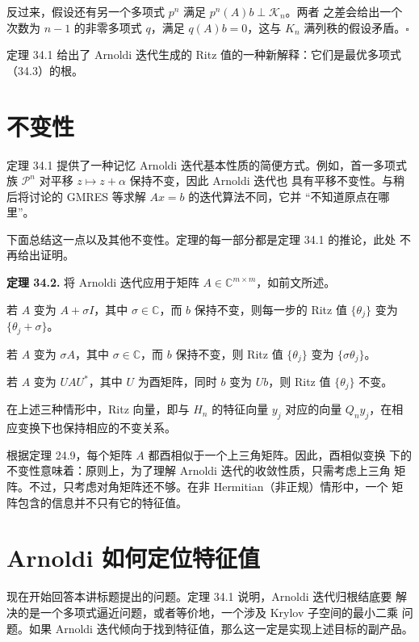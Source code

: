 \documentclass[UTF8,fontset=none,12pt]{ctexart}
\begin{document}
反过来，假设还有另一个多项式 $p^n$ 满足 $p^n(A)b\perp\mathcal K_n$。两者
之差会给出一个次数为 $n-1$ 的非零多项式 $q$，满足 $q(A)b=0$，这与 $K_n$
满列秩的假设矛盾。\hfill$\square$

定理 34.1 给出了 Arnoldi 迭代生成的 Ritz 值的一种新解释：它们是最优多项式
（34.3）的根。

\section*{不变性}

定理 34.1 提供了一种记忆 Arnoldi 迭代基本性质的简便方式。例如，首一多项式
族 $\mathcal P^n$ 对平移 $z\mapsto z+\alpha$ 保持不变，因此 Arnoldi 迭代也
具有平移不变性。与稍后将讨论的 GMRES 等求解 $Ax=b$ 的迭代算法不同，它并
“不知道原点在哪里”。

下面总结这一点以及其他不变性。定理的每一部分都是定理 34.1 的推论，此处
不再给出证明。

\textbf{定理 34.2.}
将 Arnoldi 迭代应用于矩阵 $A\in\mathbb C^{m\times m}$，如前文所述。

\begin{description}[leftmargin=3.3cm,style=sameline]
\item[平移不变性]
若 $A$ 变为 $A+\sigma I$，其中 $\sigma\in\mathbb C$，而 $b$ 保持不变，则每一步的 Ritz 值 $\{\theta_j\}$ 变为 $\{\theta_j+\sigma\}$。

\item[尺度不变性]
若 $A$ 变为 $\sigma A$，其中 $\sigma\in\mathbb C$，而 $b$ 保持不变，则 Ritz 值 $\{\theta_j\}$ 变为 $\{\sigma\theta_j\}$。

\item[酉相似变换下的不变性]
若 $A$ 变为 $UAU^*$，其中 $U$ 为酉矩阵，同时 $b$ 变为 $Ub$，则 Ritz 值 $\{\theta_j\}$ 不变。
\end{description}

在上述三种情形中，Ritz 向量，即与 $H_n$ 的特征向量 $y_j$ 对应的向量
$Q_ny_j$，在相应变换下也保持相应的不变关系。

根据定理 24.9，每个矩阵 $A$ 都酉相似于一个上三角矩阵。因此，酉相似变换
下的不变性意味着：原则上，为了理解 Arnoldi 迭代的收敛性质，只需考虑上三角
矩阵。不过，只考虑对角矩阵还不够。在非 Hermitian（非正规）情形中，一个
矩阵包含的信息并不只有它的特征值。

\section*{Arnoldi 如何定位特征值}

现在开始回答本讲标题提出的问题。定理 34.1 说明，Arnoldi 迭代归根结底要
解决的是一个多项式逼近问题，或者等价地，一个涉及 Krylov 子空间的最小二乘
问题。如果 Arnoldi 迭代倾向于找到特征值，那么这一定是实现上述目标的副产品。
\end{document}

